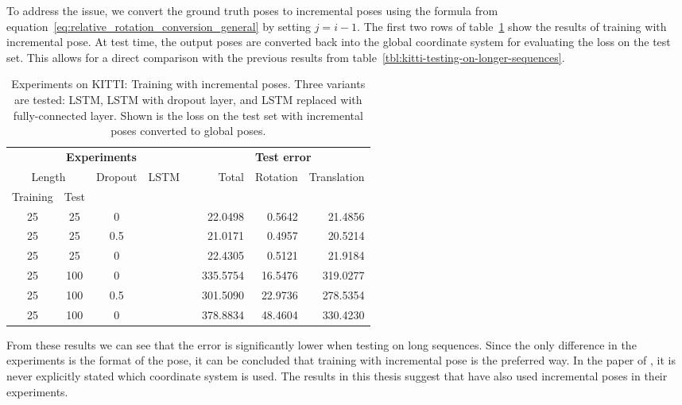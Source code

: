 		To address the issue, we convert the ground truth poses to incremental poses using the formula from equation~\ref{eq:relative_rotation_conversion_general} by setting $j = i - 1$.
		The first two rows of table~\ref{tbl:kitti-incremental-pose-and-lstm-removal} show the results of training with incremental pose.
		At test time, the output poses are converted back into the global coordinate system for evaluating the loss on the test set.
		This allows for a direct comparison with the previous results from table~\ref{tbl:kitti-testing-on-longer-sequences}.
		\begin{table}[tb]
			\small
			\begin{center}
				\begin{tabular}{cccccrrr}
					\toprule
					\multicolumn{5}{c}{\textbf{Experiments}}		& \multicolumn{3}{c}{\textbf{Test error}} 		\\
					\cmidrule(lr){1-4} 	\cmidrule(lr){6-8}
					\multicolumn{2}{c}{Length} & Dropout & LSTM &	& Total & Rotation & Translation	\\ 
					Training & Test & & & & & & \\
					\midrule
					25 & 25		& 0			& \cmark 	& 	& 22.0498	& 0.5642	& 21.4856 		\\ 
					25 & 25		& 0.5		& \cmark 	& 	& 21.0171	& 0.4957	& 20.5214		\\ 
					25 & 25		& 0			& \xmark 	& 	& 22.4305	& 0.5121	& 21.9184		\\ 
					25 & 100	& 0			& \cmark 	& 	& 335.5754	& 16.5476	& 319.0277 		\\ 
					25 & 100	& 0.5		& \cmark 	& 	& 301.5090	& 22.9736	& 278.5354 		\\ 
					25 & 100	& 0			& \xmark 	& 	& 378.8834	& 48.4604	& 330.4230 		\\ 
					\bottomrule
				\end{tabular}
			\end{center}
			\caption[Experiments on KITTI: Training with incremental poses]
					{Experiments on KITTI: Training with incremental poses.
					 Three variants are tested: LSTM, LSTM with dropout layer, and LSTM replaced with fully-connected layer.
					 Shown is the loss on the test set with incremental poses converted to global poses.
					 \label{tbl:kitti-incremental-pose-and-lstm-removal}}
		\end{table}
		From these results we can see that the error is significantly lower when testing on long sequences.
		Since the only difference in the experiments is the format of the pose, it can be concluded that training with incremental pose is the preferred way.
		In the paper of \cite{wang2017deepvo}, it is never explicitly stated which coordinate system is used.
		The results in this thesis suggest that \citeauthor{wang2017deepvo} have also used incremental poses in their experiments.
		
